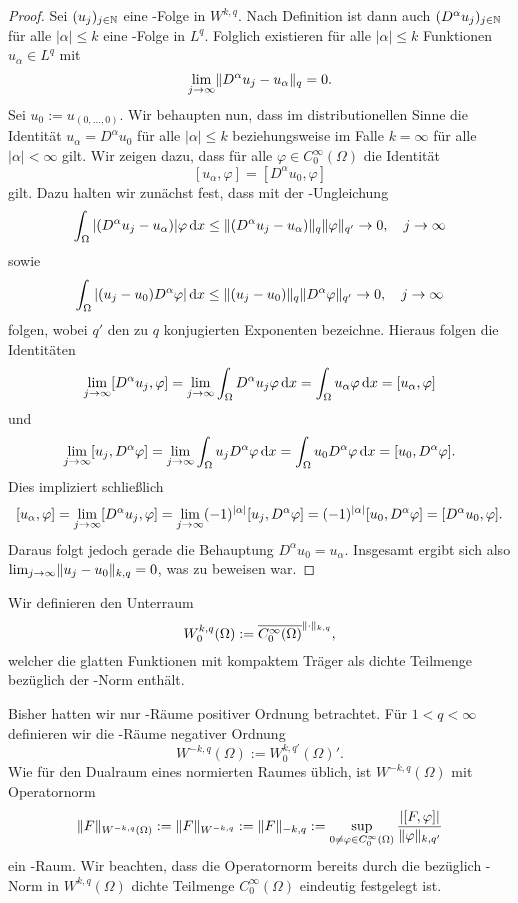 \begin{proof}
  Sei $(u_j)_{j \in \mathbb{N}}$ eine \cauchy\hyp{}Folge in $W^{k,q}$.
  Nach Definition ist dann auch $(D^\alpha u_j)_{j \in \mathbb{N}}$ für alle $|\alpha| \leq k$ eine \cauchy\hyp{}Folge in $L^q$.
  Folglich existieren für alle $|\alpha| \leq k$ Funktionen $u_\alpha \in L^q$ mit 
  $$
  \lim_{j \to \infty} \lVert D^\alpha u_j - u_\alpha \rVert_q = 0.
  $$
  Sei $u_0 := u_{(0,\dots,0)}$.
  Wir behaupten nun, dass im distributionellen Sinne die Identität $u_\alpha = D^\alpha u_0$ für alle $|\alpha| \leq k$ beziehungsweise im Falle $k = \infty$ für alle $|\alpha| < \infty$ gilt.
  Wir zeigen dazu, dass für alle $\varphi \in C_0^\infty(\Omega)$ die Identität
  $$
  [u_\alpha, \varphi] = [D^\alpha u_0, \varphi]
  $$
  gilt.
  Dazu halten wir zunächst fest, dass mit der \hoelder\hyp{}Ungleichung
  $$
  \int_\Omega |(D^\alpha u_j - u_\alpha)| \varphi \, {\operatorname{d}\!{x}}
  \leq \lVert (D^\alpha u_j - u_\alpha) \rVert_q \lVert \varphi \rVert_{q'} \to 0, \quad j \to \infty
  $$
  sowie
  $$
  \int_\Omega |(u_j - u_0) D^\alpha \varphi| \, {\operatorname{d}\!{x}}
  \leq \lVert (u_j - u_0) \rVert_q \lVert D^\alpha \varphi \rVert_{q'} \to 0, \quad j \to \infty
  $$
  folgen, wobei $q'$ den zu $q$ konjugierten Exponenten bezeichne.
  Hieraus folgen die Identitäten
  $$
  \lim_{j \to \infty} [D^\alpha u_j, \varphi] = \lim_{j \to \infty} \int_\Omega D^\alpha u_j \varphi \, {\operatorname{d}\!{x}} =  \int_\Omega u_\alpha \varphi \, {\operatorname{d}\!{x}} =  [u_\alpha, \varphi] 
  $$
  und
  $$
    \lim_{j \to \infty} [u_j, D^\alpha\varphi] = \lim_{j \to \infty} \int_\Omega u_j D^\alpha\varphi \, {\operatorname{d}\!{x}} =  \int_\Omega u_0 D^\alpha \varphi \, {\operatorname{d}\!{x}} = [u_0, D^\alpha \varphi].
  $$
  Dies impliziert schließlich
  $$ 
  [u_\alpha, \varphi] 
  = \lim_{j \to \infty} [D^\alpha u_j, \varphi] \\
  = \lim_{j \to \infty} (-1)^{|\alpha|}[u_j, D^\alpha \varphi] \\
  =  (-1)^{|\alpha|}[u_0, D^\alpha \varphi]
  = [D^\alpha u_0, \varphi].
  $$
  Daraus folgt jedoch gerade die Behauptung $D^\alpha u_0 = u_\alpha$.
  Insgesamt ergibt sich also $\lim_{j \to \infty} \lVert u_j - u_0 \rVert_{k,q} =  0$, was zu beweisen war.
\end{proof}

Wir definieren den Unterraum
$$
  W_0^{k,q}(\Omega) := \overline{C_0^\infty(\Omega)}^{\lVert \cdot \rVert_{k,q}},
$$
welcher die glatten Funktionen mit kompaktem Träger als dichte Teilmenge bezüglich der \sobolev\hyp{}Norm enthält.

Bisher hatten wir nur \sobolev\hyp{}Räume positiver Ordnung betrachtet.
Für $1 < q < \infty$ definieren wir die \sobolev\hyp{}Räume negativer Ordnung 
$$
  W^{-k,q}(\Omega) := W_0^{k,q'}(\Omega)'.
$$
Wie für den Dualraum eines normierten Raumes üblich, ist $W^{-k,q}(\Omega)$ mit Operatornorm 
$$
\lVert F \rVert_{W^{-k,q}(\Omega)} := \lVert F \rVert_{W^{-k,q}} := \lVert F \rVert_{-k,q} := \sup_{0 \neq \varphi \in C_0^\infty(\Omega)} \frac{|[F,\varphi]|}{\lVert \varphi \rVert_{k,q'}}
$$
ein \banach\hyp{}Raum.
Wir beachten, dass die Operatornorm bereits durch die bezüglich \sobolev\hyp{}Norm in $W^{k,q}(\Omega)$ dichte Teilmenge $C_0^\infty(\Omega)$ eindeutig festgelegt ist.

